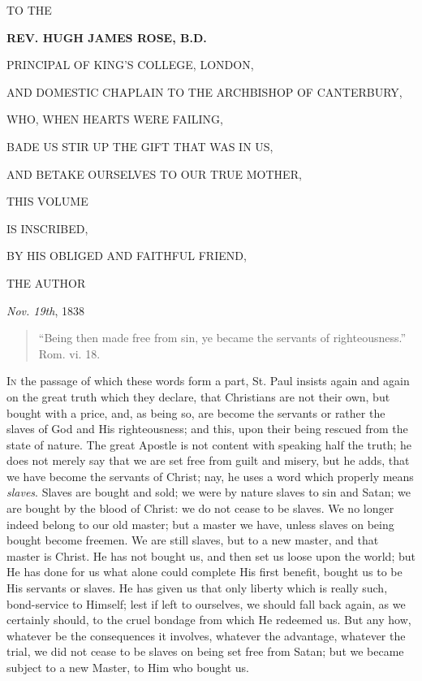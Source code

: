 




TO THE



\textbf{REV. HUGH JAMES ROSE, B.D.}



PRINCIPAL OF KING'S COLLEGE, LONDON,


AND DOMESTIC CHAPLAIN TO THE ARCHBISHOP OF
CANTERBURY,


WHO, WHEN HEARTS WERE FAILING,


BADE US STIR UP THE GIFT THAT WAS IN US,


AND BETAKE OURSELVES TO OUR TRUE MOTHER,



THIS VOLUME



IS INSCRIBED,


BY HIS OBLIGED AND FAITHFUL FRIEND,



THE AUTHOR



\emph{Nov. 19th}, 1838


\begin{quote}

``Being then made free from sin, ye became the servants of
righteousness.'' Rom. vi. 18.

\end{quote}

I\textsc{n} the passage of which these words form a part, St. Paul insists
again and again on the great truth which they declare, that Christians
are not their own, but bought with a price, and, as being so, are
become the servants or rather the slaves of God and His righteousness;
and this, upon their being rescued from the state of nature. The great
Apostle is not content with speaking half the truth; he does not
merely say that we are set free from guilt and misery, but he adds,
that we have become the servants of Christ; nay, he uses a word which
properly means \emph{slaves}. Slaves are bought and sold; we were by
nature slaves to sin and Satan; we are bought by the blood of Christ:
we do not cease to be slaves. We no longer indeed belong to our old
master; but a master we have, unless slaves on being bought become
freemen. We are still slaves, but to a new master, and that master is
Christ. He has not bought us, and then set us loose upon the world;
but He has done for us what alone could complete His first benefit,
bought us to be His servants or slaves. He has given us that only
liberty which is really such, bond-service to Himself; lest if left to
ourselves, we should fall back again, as we certainly should, to the
cruel bondage from which He redeemed us. But any how, whatever be the
consequences it involves, whatever the advantage, whatever the trial,
we did not cease to be slaves on being set free from Satan; but we
became subject to a new Master, to Him who bought us.

